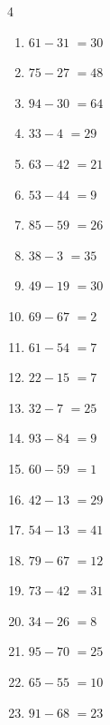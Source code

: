 \begin{multicols}{4}
\begin{enumerate}
  \item $61-31$
        $=30$

  \item $75-27$
        $=48$

  \item $94-30$
        $=64$

  \item $33-4$
        $=29$

\columnbreak %

  \item $63-42$
        $=21$

  \item $53-44$
        $=9$

  \item $85-59$
        $=26$

  \item $38-3$
        $=35$

  \item $49-19$
        $=30$

  \item $69-67$
        $=2$

  \item $61-54$
        $=7$

  \item $22-15$
        $=7$

  \item $32-7$
        $=25$

  \item $93-84$
        $=9$

  \item $60-59$
        $=1$

  \item $42-13$
        $=29$

  \item $54-13$
        $=41$

  \item $79-67$
        $=12$

  \item $73-42$
        $=31$

  \item $34-26$
        $=8$

  \item $95-70$
        $=25$

  \item $65-55$
        $=10$

  \item $91-68$
        $=23$


\end{enumerate}
\end{multicols}
